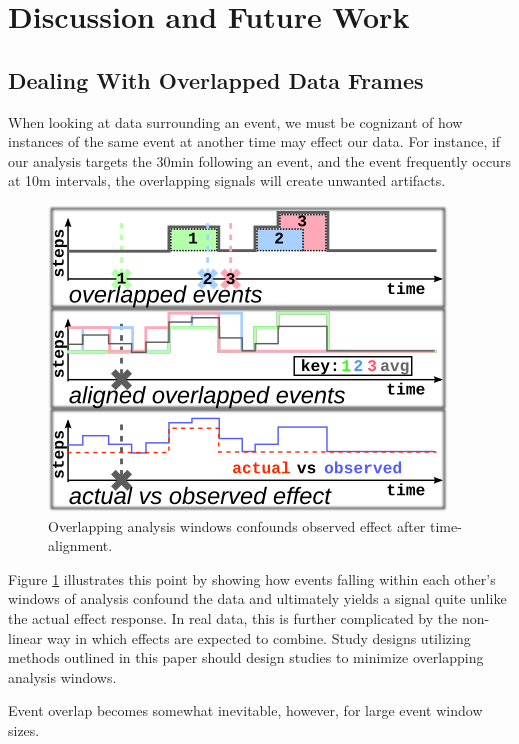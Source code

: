 \documentclass[review,journal]{vgtc}         %
\begin{document}
\section{Discussion and Future Work}

\subsection{Dealing With Overlapped Data Frames}
When looking at data surrounding an event, we must be cognizant of how instances of the same event at another time may effect our data.
For instance, if our analysis targets the 30min following an event, and the event frequently occurs at 10m intervals, the overlapping signals will create unwanted artifacts.

\begin{figure}
\centering
\includegraphics[width=0.9\columnwidth]{./img/eventOverlapExample.png}
\caption{Overlapping analysis windows confounds observed effect after time-alignment.}
\label{fig:overlapExample}
\end{figure}

Figure \ref{fig:overlapExample} illustrates this point by showing how events falling within each other's windows of analysis confound the data and ultimately yields a signal quite unlike the actual effect response.
In real data, this is further complicated by the non-linear way in which effects are expected to combine.
Study designs utilizing methods outlined in this paper should design studies to minimize overlapping analysis windows.

Event overlap becomes somewhat inevitable, however, for large event window sizes.
\end{document}
